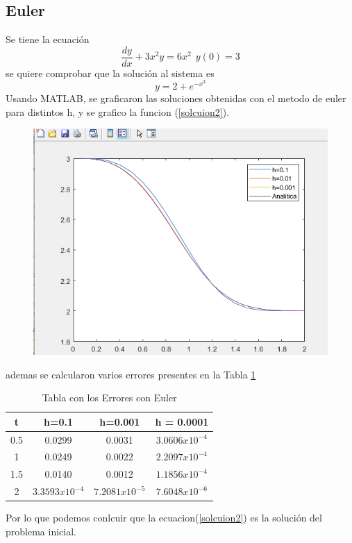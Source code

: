\documentclass[12pt]{article}
\begin{document}
\subsection{Euler}
Se tiene la ecuación $$\frac{dy}{dx}+3x^2y=6x^2~~y(0)=3$$
se quiere comprobar que la solución al sistema es
\begin{equation}
y=2+e^{-x^3}
\label{solcuion2}
\end{equation} 
Usando MATLAB, se graficaron las soluciones obtenidas con el metodo de euler para distintos h, y se grafico la funcion (\ref{solcuion2}).
\begin{figure}[h]
	\centering
	\caption{}
	\includegraphics[scale=0.45]{graf3.png}
	\label{graf3}
\end{figure}
\newpage
ademas  se calcularon varios errores presentes en la Tabla \ref{table3}
\begin{table}[h]
	\centering
	\begin{tabular}{|c|c|c|c|}
		\hline
		t & h=0.1 & h=0.001 & h = 0.0001 \\
		\hline
		0.5&0.0299&0.0031&$3.0606x10^{-4}$\\
		\hline
		1&0.0249&0.0022&$2.2097x10^{-4}$\\
		\hline
		1.5&0.0140&0.0012&$1.1856x10^{-4}$\\
		\hline
		2&$3.3593x10^{-4}$&$7.2081x10^{-5}$&$7.6048x10^{-6}$\\
		\hline
	\end{tabular}
	\caption{Tabla con los Errores con Euler}
	\label{table3}
\end{table}
Por lo que podemos conlcuir que la ecuacion(\ref{solcuion2}) es la solución del problema inicial.
\end{document}
